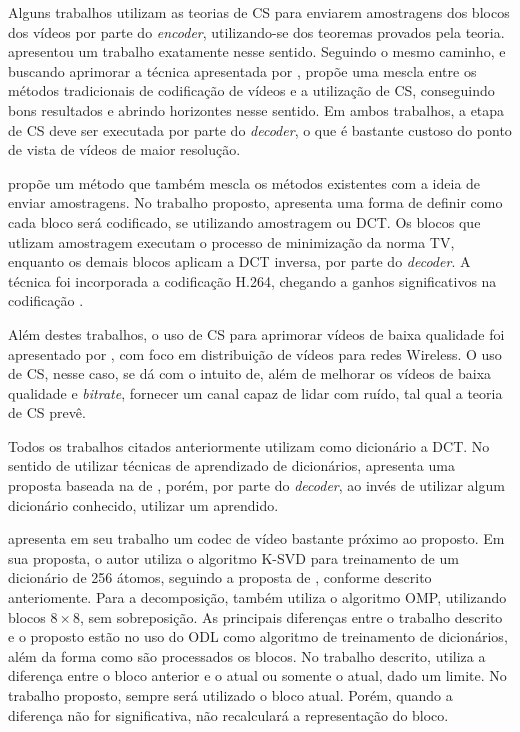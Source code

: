 \documentclass[cic,tc]{iiufrgs}
\begin{document}
Alguns trabalhos utilizam as teorias de CS para enviarem amostragens dos blocos
dos vídeos por parte do \textit{encoder}, utilizando-se dos teoremas provados pela teoria.
\citet{NebotDVC} apresentou um trabalho exatamente nesse sentido.
Seguindo o mesmo caminho, e buscando aprimorar a técnica apresentada por \citeauthor{NebotDVC}, 
\citet{DoDISCOS} propõe uma mescla entre os métodos tradicionais de codificação de vídeos
e a utilização de CS, conseguindo bons resultados e abrindo horizontes nesse sentido.
Em ambos trabalhos, a etapa de CS deve ser executada por parte do \textit{decoder}, 
o que é bastante custoso do ponto de vista de vídeos de maior resolução.

\citet{ZhangVideoCS} propõe um método que também mescla os métodos existentes
com a ideia de enviar amostragens. 
No trabalho proposto, apresenta uma forma de definir como cada bloco será codificado,
se utilizando amostragem ou DCT.
Os blocos que utlizam amostragem executam o processo de minimização da norma TV, 
enquanto os demais blocos aplicam a DCT inversa, por parte do \textit{decoder}.
A técnica foi incorporada a codificação H.264, chegando a ganhos significativos na
codificação \cite{ZhangVideoCS}.

Além destes trabalhos, o uso de CS para aprimorar vídeos de baixa qualidade foi 
apresentado por \citet{WirelessXiangCai}, com foco em distribuição de vídeos para
redes Wireless.
O uso de CS, nesse caso, se dá com o intuito de, além de melhorar os vídeos de baixa
qualidade e \textit{bitrate}, fornecer um canal capaz de lidar com ruído, 
tal qual a teoria de CS prevê.

Todos os trabalhos citados anteriormente utilizam como dicionário a DCT.
No sentido de utilizar técnicas de aprendizado de dicionários, 
\citet{chen2010dictionary} apresenta uma proposta baseada na de \citet{ZhangVideoCS},
porém, por parte do \textit{decoder}, ao invés de utilizar algum dicionário conhecido,
utilizar um aprendido.

\citet{lima2012codificaccao} apresenta em seu trabalho um codec de vídeo bastante 
próximo ao proposto.
Em sua proposta, o autor utiliza o algoritmo K-SVD para treinamento de um dicionário
de 256 átomos, seguindo a proposta de \citeauthor{BRYTFACEKSVD}, conforme descrito
anteriomente.
Para a decomposição, também utiliza o algoritmo OMP, utilizando blocos $8\times8$,
sem sobreposição.
As principais diferenças entre o trabalho descrito e o proposto
estão no uso do ODL como algoritmo de treinamento de dicionários, 
além da forma como são processados os blocos.
No trabalho descrito, \citeauthor{lima2012codificaccao} utiliza a diferença entre o
bloco anterior e o atual ou somente o atual, dado um limite. 
No trabalho proposto, sempre será utilizado o bloco atual.
Porém, quando a diferença não for significativa, não recalculará a representação do bloco.
\end{document}
